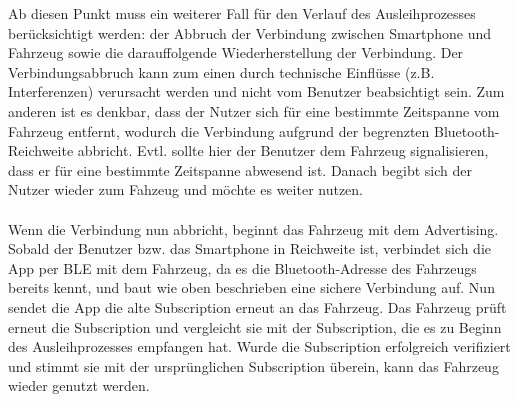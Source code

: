 Ab diesen Punkt muss ein weiterer Fall für den Verlauf des Ausleihprozesses berücksichtigt werden: der Abbruch der Verbindung zwischen Smartphone und Fahrzeug sowie die darauffolgende Wiederherstellung der Verbindung. Der Verbindungsabbruch kann zum einen durch technische Einflüsse (z.B. Interferenzen) verursacht werden und nicht vom Benutzer beabsichtigt sein. Zum anderen ist es denkbar, dass der Nutzer sich für eine bestimmte Zeitspanne vom Fahrzeug entfernt, wodurch die Verbindung aufgrund der begrenzten Bluetooth-Reichweite abbricht. Evtl. sollte hier der Benutzer dem Fahrzeug signalisieren, dass er für eine bestimmte Zeitspanne abwesend ist. Danach begibt sich der Nutzer wieder zum Fahzeug und möchte es weiter nutzen.
\\\\
Wenn die Verbindung nun abbricht, beginnt das Fahrzeug mit dem Advertising. Sobald der Benutzer bzw. das Smartphone in Reichweite ist, verbindet sich die App per BLE mit dem Fahrzeug, da es die Bluetooth-Adresse des Fahrzeugs bereits kennt, und baut wie oben beschrieben eine sichere Verbindung auf. Nun sendet die App die alte Subscription erneut an das Fahrzeug. Das Fahrzeug prüft erneut die Subscription und vergleicht sie mit der Subscription, die es zu Beginn des Ausleihprozesses empfangen hat. Wurde die Subscription erfolgreich verifiziert und stimmt sie mit der ursprünglichen Subscription überein, kann das Fahrzeug wieder genutzt werden.